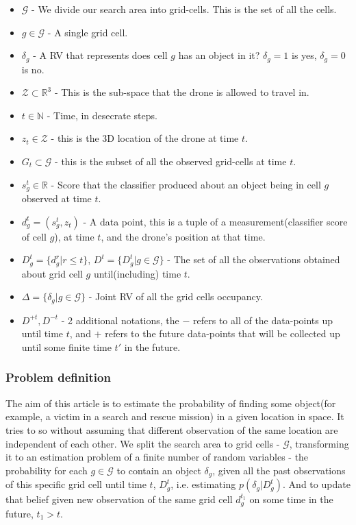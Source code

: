\documentclass{article}
\begin{document}
	\begin{itemize}
		\item $\mathcal{G}$ - We divide our search area into grid-cells. This is the set of all the cells.
		\item $g \in \mathcal{G}$ - A single grid cell.
		\item $\delta_g$ - A RV that represents does cell $g$ has an object in it? $\delta_g = 1$ is yes, $\delta_g = 0$ is no. 
		\item $\mathcal{Z} \subset \mathbb{R}^3$ - This is the sub-space that the drone is allowed to travel in. 
		\item $t \in \mathbb{N}$ - Time, in desecrate steps.	
		\item $z_t \in \mathcal{Z}$ - this is the 3D location of the drone at time $t$.
		\item $G_t \subset \mathcal{G}$ - this is the subset of all the observed grid-cells at time $t$.
		\item $s_g^t \in \mathbb{R}$ - Score that the classifier produced about an object being in cell $g$ observed at time $t$.   
		\item $d^t_g = (s_g^t, z_t)$ - A data point, this is a tuple of a measurement(classifier score of cell $g$), at time $t$, and the drone's position at that time.
		\item $D_g^t = \{d_g^r|r \leq t\}$, $D^t=\{D_g^t|g\in\mathcal{G}\}$ - The set of all the observations obtained about grid cell $g$ until(including) time $t$. 
		\item $\Delta = \{\delta_g|g\in\mathcal{G}\}$ - Joint RV of all the grid cells occupancy.
		\item $D^{+t},D^{-t}$ - 2 additional notations, the $-$ refers to all of the data-points up until time $t$, and $+$ refers to the future data-points that will be collected up until some finite time $t'$ in the future.
	\end{itemize}

	\subsubsection{Problem definition}
	The aim of this article is to estimate the probability of finding some object(for example, a victim in a search and rescue mission) in a given location in space. It tries to so without assuming that different observation of the same location are independent of each other. We split the search area to grid cells - $\mathcal{G}$, transforming it to an estimation problem of a finite number of random variables - the probability for each $g \in \mathcal{G}$ to contain an object $\delta_g$, given all the past observations of this specific grid cell until time $t$, $D_g^t$, i.e. estimating $p(\delta_g|D_g^t)$. And to update that belief given new observation of the same grid cell $d_g^{t_1}$ on some time in the future, $t_1>t$. \\
	
\end{document}
